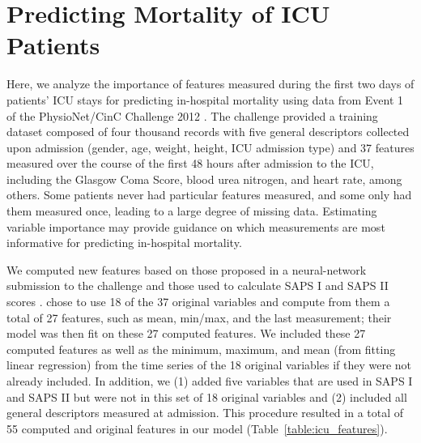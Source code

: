 \documentclass{article}
\begin{document}
\section{Predicting Mortality of ICU Patients}


Here, we analyze the importance of features measured during the first two days of patients' ICU stays for predicting in-hospital mortality using data from Event 1 of the PhysioNet/CinC Challenge 2012 \citep{silva2012predicting}.
The challenge provided a training dataset composed of four thousand records with five general descriptors collected upon admission (gender, age, weight, height, ICU admission type) and 37 features measured over the course of the first 48 hours after admission to the ICU, including the Glasgow Coma Score, blood urea nitrogen, and heart rate, among others.
Some patients never had particular features measured, and some only had them measured once, leading to a large degree of missing data.
Estimating variable importance may provide guidance on which measurements are most informative for predicting in-hospital mortality.

We computed new features based on those proposed in a neural-network submission to the challenge \citep{xia2012neural} and those used to calculate SAPS I and SAPS II scores \citep{le1984simplified, le1993new}.
\citet{xia2012neural} chose to use 18 of the 37 original variables and compute from them a total of 27 features, such as mean, min/max, and the last measurement; their model was then fit on these 27 computed features.
We included these 27 computed features as well as the minimum, maximum, and mean (from fitting linear regression) from the time series of the 18 original variables if they were not already included.
In addition, we (1) added five variables that are used in SAPS I and SAPS II but were not in this set of 18 original variables and (2) included all general descriptors measured at admission. This procedure resulted in a total of 55 computed and original features in our model (Table~\ref{table:icu_features}).
\end{document}
